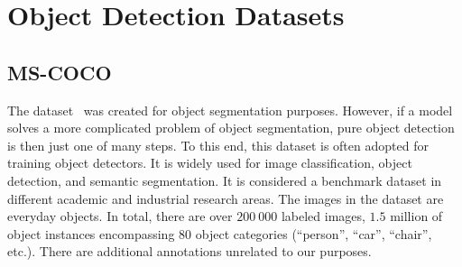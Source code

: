 \section{Object Detection Datasets}
\label{sec:ObjectDetectionDatasets}

\subsection{MS-COCO}
\label{ssec:DatasetMSCOCO}

The \mscoco{} dataset~\cite{lin2014mscoco} was created for object segmentation purposes. However, if a model solves a more complicated problem of object segmentation, pure object detection is then just one of many steps. To this end, this dataset is often adopted for training object detectors. It is widely used for image classification, object detection, and semantic segmentation. It is considered a benchmark dataset in different academic and industrial research areas. The images in the dataset are everyday objects. In total, there are over $200\ 000$ labeled images, $1.5$ million of object instances encompassing $80$ object categories (``person'', ``car'', ``chair'', etc.). There are additional annotations unrelated to our purposes.
